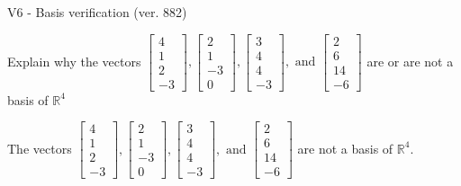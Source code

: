 \begin{exercise}
  \begin{exerciseTitle}V6 - Basis verification (ver. 882)\end{exerciseTitle}
  \begin{exerciseStatement}
    Explain why the vectors \(\left[\begin{array}{r}
4 \\
1 \\
2 \\
-3
\end{array}\right] , \left[\begin{array}{r}
2 \\
1 \\
-3 \\
0
\end{array}\right] , \left[\begin{array}{r}
3 \\
4 \\
4 \\
-3
\end{array}\right] , \text{ and } \left[\begin{array}{r}
2 \\
6 \\
14 \\
-6
\end{array}\right]\) are or are not a basis of \(\mathbb{R}^4\)	


  \end{exerciseStatement}
  \begin{exerciseAnswer}
   The vectors \(\left[\begin{array}{r}
4 \\
1 \\
2 \\
-3
\end{array}\right] , \left[\begin{array}{r}
2 \\
1 \\
-3 \\
0
\end{array}\right] , \left[\begin{array}{r}
3 \\
4 \\
4 \\
-3
\end{array}\right] , \text{ and } \left[\begin{array}{r}
2 \\
6 \\
14 \\
-6
\end{array}\right]\) 
  	 are not  a basis of \(\mathbb{R}^4\).
  


  \end{exerciseAnswer}
\end{exercise}